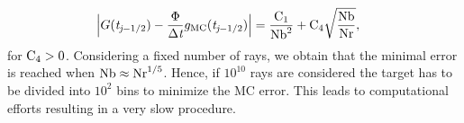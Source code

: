 \begin{equation} \begin{aligned}
\Big|G(\textit{t}_{\textit{j}-1/2})&-\frac{\Phi}
{\Delta\textit{t}}g_{\textrm{MC}}(\textit{t}_{\textit{j}-1/2})\Big| =
\frac{\textrm{C}_1}{\textrm{Nb}^2} + \textrm{C}_4\sqrt{\frac{\textrm{Nb}}{\textrm{Nr}}},
\end{aligned}
\end{equation}
for $\textrm{C}_4>0$.
Considering a fixed number of rays, we obtain that the minimal error is reached when $\textrm{Nb}\approx \textrm{Nr}^{1/5}$.
Hence, if $10^{10}$ rays are considered the target has to be divided into $10^2$ bins to minimize the MC error.
This leads to computational efforts resulting in a very slow procedure.





